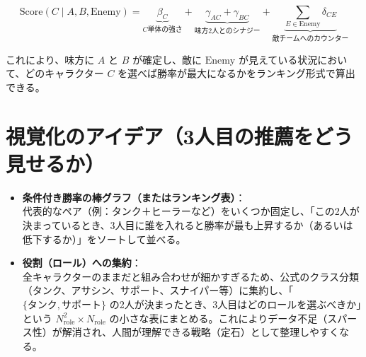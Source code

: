 \documentclass[a4paper,11pt]{ltjsarticle}
\begin{document}
\begin{equation}
  \mathrm{Score}(C \mid A, B, \mathrm{Enemy}) = \underbrace{\beta_C}_{C\text{単体の強さ}} + \underbrace{\gamma_{AC} + \gamma_{BC}}_{\text{味方2人とのシナジー}} + \underbrace{\sum_{E \in \mathrm{Enemy}} \delta_{CE}}_{\text{敵チームへのカウンター}}
\end{equation}

これにより、味方に $A$ と $B$ が確定し、敵に $\mathrm{Enemy}$ が見えている状況において、どのキャラクター $C$ を選べば勝率が最大になるかをランキング形式で算出できる。

\section{視覚化のアイデア（3人目の推薦をどう見せるか）}

\begin{itemize}
  \item \textbf{条件付き勝率の棒グラフ（またはランキング表）}：\\
  代表的なペア（例：タンク＋ヒーラーなど）をいくつか固定し、「この2人が決まっているとき、3人目に誰を入れると勝率が最も上昇するか（あるいは低下するか）」をソートして並べる。
  \item \textbf{役割（ロール）への集約}：\\
  全キャラクターのままだと組み合わせが細かすぎるため、公式のクラス分類（タンク、アサシン、サポート、スナイパー等）に集約し、「$\{\text{タンク}, \text{サポート}\}$ の2人が決まったとき、3人目はどのロールを選ぶべきか」という $N_{\mathrm{role}}^2 \times N_{\mathrm{role}}$ の小さな表にまとめる。これによりデータ不足（スパース性）が解消され、人間が理解できる戦略（定石）として整理しやすくなる。
\end{itemize}
\end{document}

